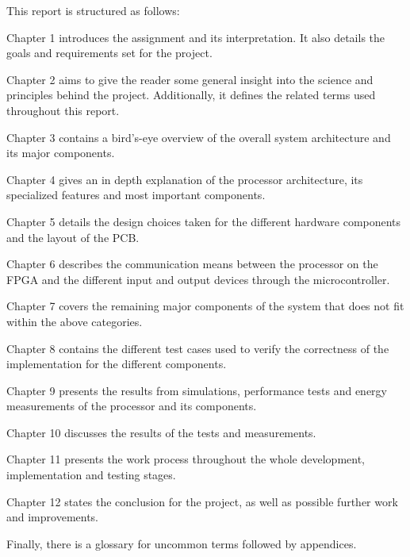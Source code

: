 This report is structured as follows:

Chapter 1 introduces the assignment and its interpretation. 
It also details the goals and requirements set for the project.

Chapter 2 aims to give the reader some general insight into the science and principles behind the project.
Additionally, it defines the related terms used throughout this report.

Chapter 3 contains a bird's-eye overview of the overall system architecture and its major components.

Chapter 4 gives an in depth explanation of the processor architecture, its specialized features and most important components.

Chapter 5 details the design choices taken for the different hardware components and the layout of the PCB.

Chapter 6 describes the communication means between the processor on the FPGA and the different input and output devices through the microcontroller.

Chapter 7 covers the remaining major components of the system that does not fit within the above categories.

Chapter 8 contains the different test cases used to verify the correctness of the implementation for the different components.

Chapter 9 presents the results from simulations, performance tests and energy measurements of the processor and its components.

Chapter 10 discusses the results of the tests and measurements.

Chapter 11 presents the work process throughout the whole development, implementation and testing stages.

Chapter 12 states the conclusion for the project, as well as possible further work and improvements.

Finally, there is a glossary for uncommon terms followed by appendices.

